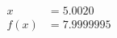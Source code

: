 \documentclass[preview]{standalone}
\begin{document}
\begin{align*}
x &= 5.0020\\f(x) &= 7.9999995
\end{align*}
\end{document}
